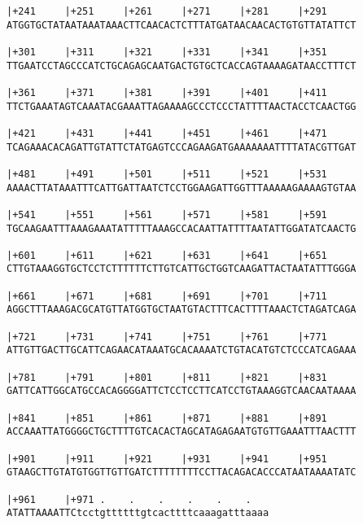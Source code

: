 \documentclass{article}
\begin{document}
\begin{Verbatim}
|+241     |+251     |+261     |+271     |+281     |+291     
ATGGTGCTATAATAAATAAACTTCAACACTCTTTATGATAACAACACTGTGTTATATTCT
                                                            
|+301     |+311     |+321     |+331     |+341     |+351     
TTGAATCCTAGCCCATCTGCAGAGCAATGACTGTGCTCACCAGTAAAAGATAACCTTTCT
                                                            
|+361     |+371     |+381     |+391     |+401     |+411     
TTCTGAAATAGTCAAATACGAAATTAGAAAAGCCCTCCCTATTTTAACTACCTCAACTGG
                                                            
|+421     |+431     |+441     |+451     |+461     |+471     
TCAGAAACACAGATTGTATTCTATGAGTCCCAGAAGATGAAAAAAATTTTATACGTTGAT
                                                            
|+481     |+491     |+501     |+511     |+521     |+531     
AAAACTTATAAATTTCATTGATTAATCTCCTGGAAGATTGGTTTAAAAAGAAAAGTGTAA
                                                            
|+541     |+551     |+561     |+571     |+581     |+591     
TGCAAGAATTTAAAGAAATATTTTTAAAGCCACAATTATTTTAATATTGGATATCAACTG
                                                            
|+601     |+611     |+621     |+631     |+641     |+651     
CTTGTAAAGGTGCTCCTCTTTTTTCTTGTCATTGCTGGTCAAGATTACTAATATTTGGGA
                                                            
|+661     |+671     |+681     |+691     |+701     |+711     
AGGCTTTAAAGACGCATGTTATGGTGCTAATGTACTTTCACTTTTAAACTCTAGATCAGA
                                                            
|+721     |+731     |+741     |+751     |+761     |+771     
ATTGTTGACTTGCATTCAGAACATAAATGCACAAAATCTGTACATGTCTCCCATCAGAAA
                                                            
|+781     |+791     |+801     |+811     |+821     |+831     
GATTCATTGGCATGCCACAGGGGATTCTCCTCCTTCATCCTGTAAAGGTCAACAATAAAA
                                                            
|+841     |+851     |+861     |+871     |+881     |+891     
ACCAAATTATGGGGCTGCTTTTGTCACACTAGCATAGAGAATGTGTTGAAATTTAACTTT
                                                            
|+901     |+911     |+921     |+931     |+941     |+951     
GTAAGCTTGTATGTGGTTGTTGATCTTTTTTTTCCTTACAGACACCCATAATAAAATATC
                                                            
|+961     |+971 .    .    .    .    .    .   
ATATTAAAATTCtcctgttttttgtcacttttcaaagatttaaaa
                                 
                                             
\end{Verbatim}
\end{document}
